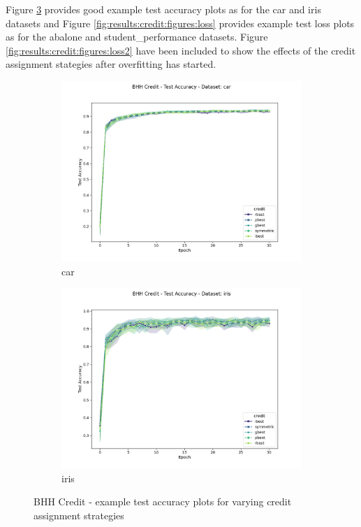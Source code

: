Figure \ref{fig:results:credit:figures:accuracy} provides good example test accuracy plots as for the car and iris datasets and Figure \ref{fig:results:credit:figures:loss} provides example test loss plots as for the abalone and student\_performance datasets. Figure \ref{fig:results:credit:figures:loss2} have been included to show the effects of the credit assignment stategies after overfitting has started.


\begin{figure}[htbp]
	\begin{subfigure}{0.5\textwidth}
    	\centering
        \includegraphics[width=\textwidth]{analysis/bhh_credit/figures/test/accuracy/car.png}
        \caption{car}
        \label{fig:results:credit:figures:accuracy1}
	\end{subfigure}
		\begin{subfigure}{0.5\textwidth}
    	\centering
        \includegraphics[width=\textwidth]{analysis/bhh_credit/figures/test/accuracy/iris.png}
        \caption{iris}
        \label{fig:results:credit:figures:accuracy2}
	\end{subfigure}
	\caption{\Acs{BHH} Credit - example test accuracy plots for varying credit assignment strategies}
	\label{fig:results:credit:figures:accuracy}
\end{figure}


